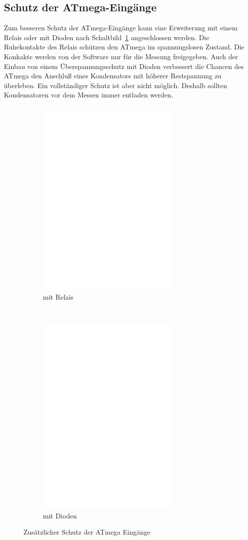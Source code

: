 \subsection{Schutz der ATmega-Eingänge}  

Zum besseren Schutz der ATmega-Eingänge kann eine Erweiterung mit einem Relais oder mit Dioden
nach Schaltbild~\ref{fig:relay_addon} angeschlossen werden.
Die Ruhekontakte des Relais schützen den ATmega im spannungslosen Zustand.
Die Konkakte werden von der Software nur für die Messung freigegeben.
Auch der Einbau von einem Überspannungsschutz mit Dioden verbessert die Chancen des ATmega
den Anschluß eines Kondensators mit höherer Restspannung zu überleben.
Ein vollständiger Schutz ist aber nicht möglich. Deshalb sollten Kondensatoren vor dem Messen immer
entladen werden.

\begin{figure}[H]
  \begin{subfigure}[b]{9cm}
    \centering
    \includegraphics[width=7cm]{../FIG/relay_addon.eps}
    \caption{mit Relais}
  \end{subfigure}
  ~
  \begin{subfigure}[b]{9cm}
    \centering
    \includegraphics[width=7cm]{../FIG/diode_addon.eps}
    \caption{mit Dioden}
  \end{subfigure}
  \caption{Zusätzlicher Schutz der ATmega Eingänge}
  \label{fig:relay_addon}
\end{figure}

